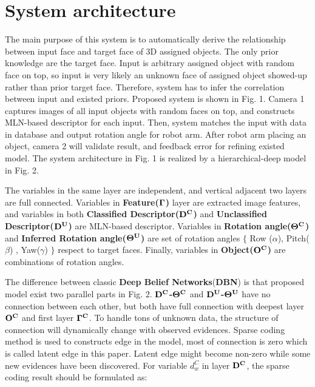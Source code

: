 \documentclass[journal]{IEEEtran}
\begin{document}
\section{System architecture} 

The main purpose of this system is to automatically derive the relationship between input face and target face of 3D assigned objects. The only prior knowledge are the target face. Input is arbitrary assigned object with random face on top, so input is very likely an unknown face of assigned object showed-up rather than prior target face. Therefore, system has to infer the correlation between input and existed priors.  Proposed system is shown in Fig. 1. Camera 1 captures images of all input objects with random faces on top, and constructs MLN-based descriptor for each input. Then, system matches the input with data in database and output rotation angle for robot arm. After robot arm placing an object, camera 2 will validate result, and feedback error for refining existed model. The system architecture in Fig. 1 is realized by a hierarchical-deep model in Fig. 2. 

The variables in the same layer are independent, and vertical adjacent two layers are full connected. Variables in \textbf{Feature($\bf{\Gamma}$)} layer are extracted image features, and variables in both \textbf{Classified Descriptor($\bf{D^C}$)} and \textbf{Unclassified Descriptor($\bf{D^U}$)} are MLN-based descriptor. Variables in \textbf{Rotation angle($\bf{\Theta^{C}}$)} and \textbf{Inferred Rotation angle($\bf{\Theta^U}$)} are set of rotation angles $\{$ Row ($\alpha$), Pitch($\beta$) , Yaw($\gamma$) $\}$ respect to target faces. Finally, variables in \textbf{Object($\bf{O^C}$)} are combinations of rotation angles.


The difference between classic \textbf{Deep Belief Networks}(\textbf{DBN}) is that proposed model exist two parallel parts in Fig. 2. \textbf{$\bf{D^C}$-$\bf{\Theta^{C}}$} and \textbf{$\bf{D^U}$-$\bf{\Theta^U}$} have no connection between each other, but both have full connection with deepest layer $\bf{O^C}$ and first layer \textbf{$\bf{\Gamma^{C}}$}. To handle tons of unknown data, the structure of connection will dynamically change with observed evidences. Sparse coding method is used to constructs edge in the model, most of connection is zero which is called latent edge in this paper. Latent edge might become non-zero while some new evidences have been discovered. For variable $d^C_w$ in layer $\bf{D^C}$, the sparse coding result should be formulated as:
\end{document}
